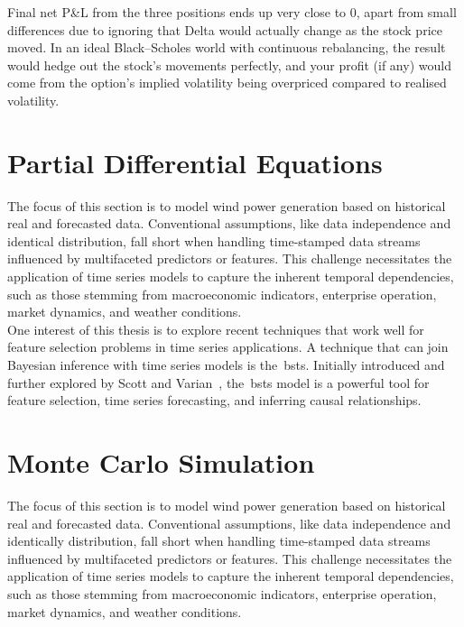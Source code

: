     Final net P\&L from the three positions ends up very close to $0$,
    apart from small differences due to ignoring that Delta would actually change as the stock price moved.
    In an ideal Black–Scholes world with continuous rebalancing,
    the result would hedge out the stock’s movements perfectly,
    and your profit (if any) would come from the option’s implied volatility being overpriced compared to
    realised volatility.

\section{Partial Differential Equations}
    \label{sec:pde}

    The focus of this section is to model wind power generation based on historical real and forecasted data.
    Conventional assumptions, like data independence and identical distribution, fall short when handling time-stamped
    data streams influenced by multifaceted predictors or features.
    This challenge necessitates the application of time series models to capture the inherent temporal dependencies,
    such as those stemming from macroeconomic indicators, enterprise operation, market dynamics, and weather conditions.\\

    One interest of this thesis is to explore recent techniques that work well for feature selection problems in
    time series applications.
    A technique that can join Bayesian inference with time series models is the~\gls{bsts}.
    Initially introduced and further explored by Scott and Varian~\cite{scott_predicting_2013, scott_bayesian_2013},
    the~\gls{bsts} model is a powerful tool for feature selection,
time series forecasting, and inferring causal relationships. \\


\section{Monte Carlo Simulation}
    \label{sec:mc_sim}

    The focus of this section is to model wind power generation based on historical real and forecasted data.
    Conventional assumptions, like data independence and identically distribution, fall short when handling time-stamped
    data streams influenced by multifaceted predictors or features.
    This challenge necessitates the application of time series models to capture the inherent temporal dependencies,
    such as those stemming from macroeconomic indicators, enterprise operation, market dynamics, and weather conditions.\\

